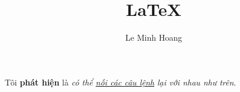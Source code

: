 \documentclass[a4paper]{article}
\title{LaTeX}
\author{Le Minh Hoang}
\date{}
\begin{document}
\maketitle

Tôi \textbf{phát hiện} 
là \textit{có thể \underline{nối các câu lệnh}
lại với nhau \emph{như trên}}.
\end{document}

